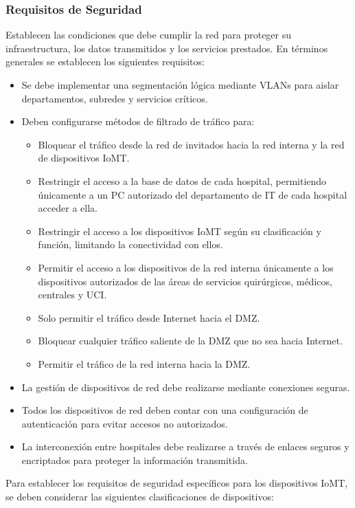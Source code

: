 \subsubsection{Requisitos de Seguridad}
\label{subsec: TiposIoMT}
Establecen las condiciones que debe cumplir la red para proteger su infraestructura, los datos transmitidos y los servicios prestados. En términos generales se establecen los siguientes requisitos:
\begin{itemize}
    \item Se debe implementar una segmentación lógica mediante VLANs para aislar departamentos, subredes y servicios críticos.
    \item Deben configurarse métodos de filtrado de tráfico para:
    \begin{itemize}
        \item Bloquear el tráfico desde la red de invitados hacia la red interna y la red de dispositivos IoMT.
        \item Restringir el acceso a la base de datos de cada hospital, permitiendo únicamente a un PC autorizado del departamento de IT de cada hospital acceder a ella.
        \item Restringir el acceso a los dispositivos IoMT según su clasificación y función, limitando la conectividad con ellos.
        \item Permitir el acceso a los dispositivos de la red interna únicamente a los dispositivos autorizados de las áreas de servicios quirúrgicos, médicos, centrales y \ac{UCI}.
        \item Solo permitir el tráfico desde Internet hacia el DMZ.
        \item Bloquear cualquier tráfico saliente de la DMZ que no sea hacia Internet.
        \item Permitir el tráfico de la red interna hacia la DMZ.
    \end{itemize}
    \item La gestión de dispositivos de red debe realizarse mediante conexiones seguras.
    \item Todos los dispositivos de red deben contar con una configuración de autenticación para evitar accesos no autorizados.
    \item La interconexión entre hospitales debe realizarse a través de enlaces seguros y encriptados para proteger la información transmitida.
\end{itemize}
Para establecer los requisitos de seguridad específicos para los dispositivos IoMT, se deben considerar las siguientes clasificaciones de dispositivos:
